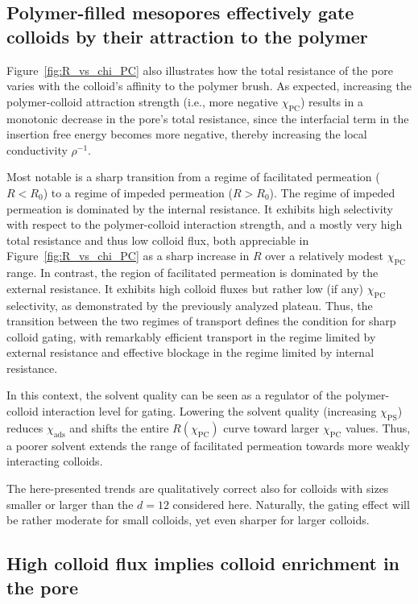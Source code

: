 \documentclass[12pt, a4paper]{article}
\newcommand{\todo}[1]{\pdfcomment{#1}} %
\begin{document}
\subsection{Polymer-filled mesopores effectively gate colloids by their attraction to the polymer}

Figure~\ref{fig:R_vs_chi_PC} also illustrates how the total resistance of the pore varies with the colloid's affinity to the polymer brush.
As expected, increasing the polymer-colloid attraction strength (i.e., more negative $\chi_{\text{PC}}$) results in a monotonic decrease in the pore's total resistance, since the interfacial term in the insertion free energy becomes more negative, thereby increasing the local conductivity $\rho^{-1}$.

Most notable is a sharp transition from a regime of facilitated permeation ($R < R_0$) to a regime of impeded permeation ($R > R_0$).
The regime of impeded permeation is dominated by the internal resistance.
It exhibits high selectivity with respect to the polymer-colloid interaction strength, and a mostly very high total resistance and thus low colloid flux, both appreciable in Figure~\ref{fig:R_vs_chi_PC} as a sharp increase in $R$ over a relatively modest $\chi_{\text{PC}}$ range.
In contrast, the region of facilitated permeation is dominated by the external resistance. 
It exhibits high colloid fluxes but rather low (if any) $\chi_{\text{PC}}$ selectivity, as demonstrated by the previously analyzed plateau.
Thus, the transition between the two regimes of transport defines the condition for sharp colloid gating, with remarkably efficient transport in the regime limited by external resistance and effective blockage in the regime limited by internal resistance.

In this context, the solvent quality can be seen as a regulator of the polymer-colloid interaction level for gating. 
Lowering the solvent quality (increasing $\chi_{\text{PS}}$) reduces $\chi_{\text{ads}}$ and shifts the entire $R(\chi_{\text{PC}})$ curve toward larger $\chi_{\text{PC}}$ values.
Thus, a poorer solvent extends the range of facilitated permeation towards more weakly interacting colloids.

The here-presented trends are qualitatively correct also for colloids with sizes smaller or larger than the $d=12$ considered here.
\todo{RR: Ditto.}
Naturally, the gating effect will be rather moderate for small colloids, yet even sharper for larger colloids.


\subsection{High colloid flux implies colloid enrichment in the pore}
\end{document}

